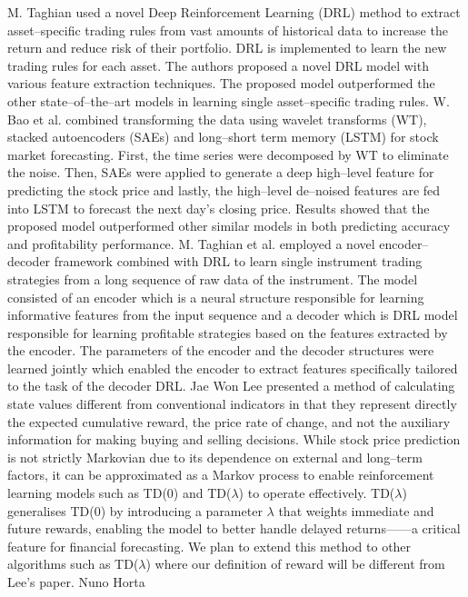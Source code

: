 \documentclass[12pt,a4paper]{report}
\numberwithin{equation}{section}
\begin{document}
M. Taghian \cite{taghian2022learning_56} used a novel Deep Reinforcement Learning (DRL)
method to extract asset--specific trading rules from vast amounts of
historical data to increase the return and reduce risk of their
portfolio. DRL is implemented to learn the new trading rules for each
asset. The authors proposed a novel DRL model with various feature
extraction techniques. The proposed model outperformed the other
state--of--the--art models in learning single asset--specific trading rules.
W. Bao et al. \cite{w2017deep_57} combined transforming the data using wavelet
transforms (WT), stacked autoencoders (SAEs) and long--short term memory
(LSTM) for stock market forecasting. First, the time series were
decomposed by WT to eliminate the noise. Then, SAEs were applied to
generate a deep high--level feature for predicting the stock price and
lastly, the high--level de--noised features are fed into LSTM to forecast
the next day's closing price. Results showed that the proposed model
outperformed other similar models in both predicting accuracy and
profitability performance. M. Taghian et al. \cite{taghian2021reinforcement_58} employed a novel
encoder--decoder framework combined with DRL to learn single instrument
trading strategies from a long sequence of raw data of the instrument.
The model consisted of an encoder which is a neural structure
responsible for learning informative features from the input sequence
and a decoder which is DRL model responsible for learning profitable
strategies based on the features extracted by the encoder. The
parameters of the encoder and the decoder structures were learned
jointly which enabled the encoder to extract features specifically
tailored to the task of the decoder DRL. Jae Won Lee \cite{lee2001stock_59} presented
a method of calculating state values different from conventional
indicators in that they represent directly the expected cumulative
reward, the price rate of change, and not the auxiliary information for
making buying and selling decisions. While stock price prediction is not
strictly Markovian due to its dependence on external and long--term
factors, it can be approximated as a Markov process to enable
reinforcement learning models such as TD(0) and TD($\lambda$) to operate
effectively. TD($\lambda$) generalises TD(0) by introducing a parameter $\lambda$ that
weights immediate and future rewards, enabling the model to better
handle delayed returns------a critical feature for financial forecasting.
We plan to extend this method to other algorithms such as TD($\lambda$) where
our definition of reward will be different from Lee's paper. Nuno Horta
\end{document}
